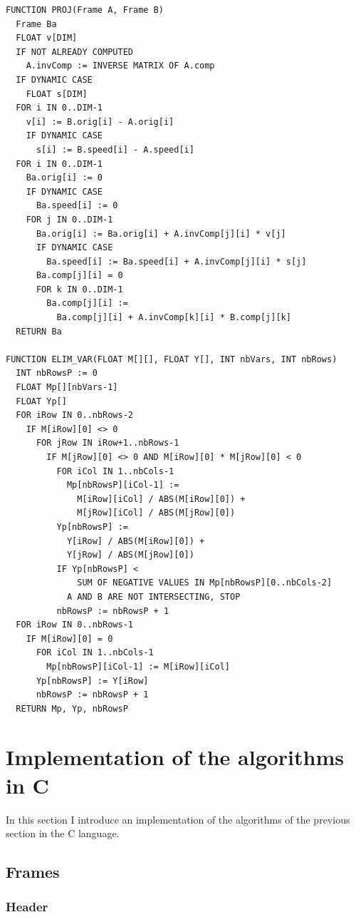 \documentclass[12pt, a4paper]{article}
\begin{document}
\begin{lstlisting}[breaklines]
FUNCTION PROJ(Frame A, Frame B)
  Frame Ba
  FLOAT v[DIM]
  IF NOT ALREADY COMPUTED
    A.invComp := INVERSE MATRIX OF A.comp
  IF DYNAMIC CASE
    FLOAT s[DIM]
  FOR i IN 0..DIM-1
    v[i] := B.orig[i] - A.orig[i] 
    IF DYNAMIC CASE
      s[i] := B.speed[i] - A.speed[i] 
  FOR i IN 0..DIM-1
    Ba.orig[i] := 0
    IF DYNAMIC CASE
      Ba.speed[i] := 0 
    FOR j IN 0..DIM-1
      Ba.orig[i] := Ba.orig[i] + A.invComp[j][i] * v[j] 
      IF DYNAMIC CASE
        Ba.speed[i] := Ba.speed[i] + A.invComp[j][i] * s[j] 
      Ba.comp[j][i] = 0 
      FOR k IN 0..DIM-1
        Ba.comp[j][i] :=
          Ba.comp[j][i] + A.invComp[k][i] * B.comp[j][k] 
  RETURN Ba

FUNCTION ELIM_VAR(FLOAT M[][], FLOAT Y[], INT nbVars, INT nbRows)
  INT nbRowsP := 0 
  FLOAT Mp[][nbVars-1]
  FLOAT Yp[]
  FOR iRow IN 0..nbRows-2
    IF M[iRow][0] <> 0
      FOR jRow IN iRow+1..nbRows-1
        IF M[jRow][0] <> 0 AND M[iRow][0] * M[jRow][0] < 0
          FOR iCol IN 1..nbCols-1
            Mp[nbRowsP][iCol-1] := 
              M[iRow][iCol] / ABS(M[iRow][0]) + 
              M[jRow][iCol] / ABS(M[jRow][0]) 
          Yp[nbRowsP] := 
            Y[iRow] / ABS(M[iRow][0]) +
            Y[jRow] / ABS(M[jRow][0]) 
          IF Yp[nbRowsP] < 
              SUM OF NEGATIVE VALUES IN Mp[nbRowsP][0..nbCols-2]
            A AND B ARE NOT INTERSECTING, STOP
          nbRowsP := nbRowsP + 1 
  FOR iRow IN 0..nbRows-1
    IF M[iRow][0] = 0
      FOR iCol IN 1..nbCols-1
        Mp[nbRowsP][iCol-1] := M[iRow][iCol] 
      Yp[nbRowsP] := Y[iRow] 
      nbRowsP := nbRowsP + 1 
  RETURN Mp, Yp, nbRowsP
\end{lstlisting}


\section{Implementation of the algorithms in C}

In this section I introduce an implementation of the algorithms of the previous section in the C language.\\

\subsection{Frames}

\subsubsection{Header}
\end{document}
